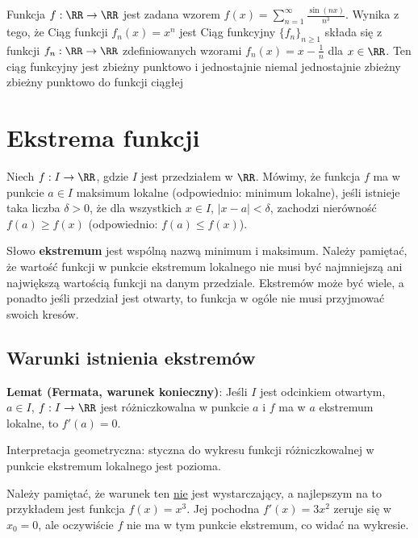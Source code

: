 \begin{problems}
    \prob Funkcja $f:\RR\rightarrow\RR$ jest zadana wzorem $f(x)=\sum_{n=1}^\infty\frac{\sin(nx)}{n^3}$. Wynika z tego, że
    \prob Ciąg funkcji $f_n(x) = x^n$ jest
    \answers{zbieżny punktowo na $[0, 1]$}{zbieżny jednostajnie na $[0, 1)$}{ograniczony na $[0, 1 + \epsilon)$ dla pewnego $\epsilon > 0$}
    \prob Ciąg funkcyjny $\{f_n\}_{n\geq1}$ składa się z funkcji $f_n : \RR \rightarrow \RR$ zdefiniowanych wzorami $f_n(x) = x - \frac{1}{n}$ dla $x \in \RR$. Ten ciąg funkcyjny jest
    \answers
    {zbieżny punktowo i jednostajnie}
    {niemal jednostajnie zbieżny}
    {zbieżny punktowo do funkcji ciągłej}
\end{problems}

\section{Ekstrema funkcji}
Niech $f:I\to\RR$, gdzie $I$ jest przedziałem w $\RR$. Mówimy, że funkcja $f$ ma w punkcie $a\in I$ maksimum lokalne (odpowiednio: minimum lokalne), jeśli istnieje taka liczba $\delta>0$, że dla wszystkich $x\in I$, $|x-a|<\delta$, zachodzi nierówność $f(a)\geq f(x)$ (odpowiednio: $f(a)\leq f(x)$).

Słowo \textbf{ekstremum} jest wspólną nazwą minimum i maksimum. Należy pamiętać, że wartość funkcji w punkcie ekstremum lokalnego nie musi być najmniejszą ani największą wartością funkcji na danym przedziale. Ekstremów może być wiele, a ponadto jeśli przedział jest otwarty, to funkcja w ogóle nie musi przyjmować swoich kresów.

\subsection{Warunki istnienia ekstremów}
\textbf{Lemat (Fermata, warunek konieczny)}:
Jeśli $I$ jest odcinkiem otwartym, $a\in I$, $f:I\to\RR$ jest różniczkowalna w punkcie $a$ i $f$ ma w $a$ ekstremum lokalne, to $f'(a)=0$.

Interpretacja geometryczna: styczna do wykresu funkcji różniczkowalnej w punkcie ekstremum lokalnego jest pozioma.

\begin{example}
    Należy pamiętać, że warunek ten \underline{nie} jest wystarczający, a najlepszym na to przykładem jest funkcja $f(x)=x^3$. Jej pochodna $f'(x)=3x^2$ zeruje się w $x_0=0$, ale oczywiście $f$ nie ma w tym punkcie ekstremum, co widać na wykresie.
\end{example}

